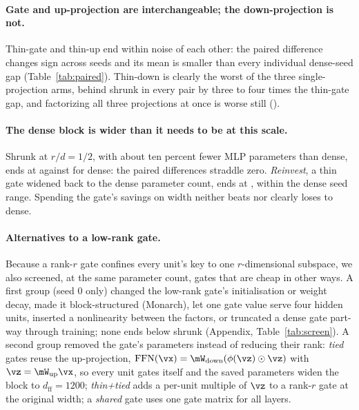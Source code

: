 \documentclass{article}
\begin{document}
\paragraph{Gate and up-projection are interchangeable; the down-projection is not.} Thin-gate and thin-up
end within noise of each other: the paired difference changes sign across seeds and its mean is smaller
than every individual dense-seed gap (Table~\ref{tab:paired}). Thin-down is clearly the worst of the three
single-projection arms, behind shrunk in every pair by three to four times the thin-gate gap, and
factorizing all three projections at once is worse still (\meanAllLowrankRFour).

\paragraph{The dense block is wider than it needs to be at this scale.} Shrunk at $r/d = 1/2$, with about
ten percent fewer MLP parameters than dense, ends at \meanShrunkRTwo{} against \denseMean{} for dense: the
paired differences straddle zero. \emph{Reinvest}, a thin gate widened back to the dense parameter count,
ends at \meanReinvestRFour{}, within the dense seed range. Spending the gate's savings on width neither beats
nor clearly loses to dense.

\paragraph{Alternatives to a low-rank gate.} Because a rank-$r$ gate confines every unit's key to one
$r$-dimensional subspace, we also screened, at the same parameter count, gates that are cheap in other
ways. A first group (seed 0 only) changed the low-rank gate's initialisation or weight decay, made it
block-structured (Monarch), let one gate value serve four hidden units, inserted a nonlinearity between the
factors, or truncated a dense gate part-way through training; none ends below shrunk (Appendix,
Table~\ref{tab:screen}). A second group removed the gate's parameters instead of reducing their rank:
\emph{tied} gates reuse the up-projection, $\mathrm{FFN}(\vx) = \mW_{\mathrm{down}}(\phi(\vz) \odot \vz)$
with $\vz = \mW_{\mathrm{up}}\vx$, so every unit gates itself and the saved parameters widen the block to
$d_{\mathrm{ff}} = 1200$; \emph{thin+tied} adds a per-unit multiple of $\vz$ to a rank-$r$ gate at the
original width; a \emph{shared} gate uses one gate matrix for all layers.
\end{document}
